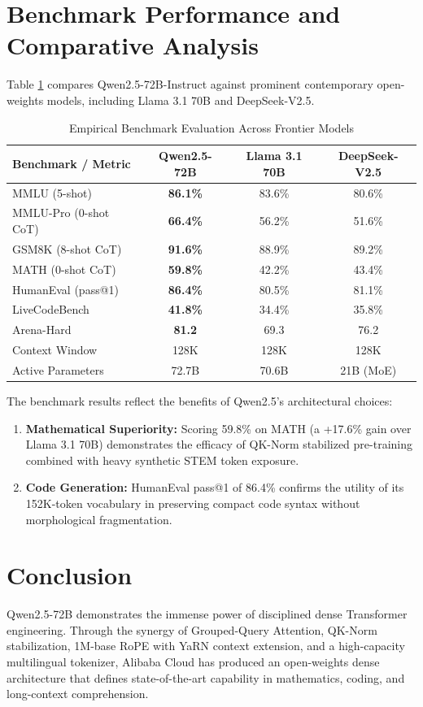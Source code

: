 \documentclass[conference]{IEEEtran}
\begin{document}
\section{Benchmark Performance and Comparative Analysis}
Table \ref{tab:benchmarks} compares Qwen2.5-72B-Instruct against prominent contemporary open-weights models, including Llama 3.1 70B \cite{dubey2024llama3} and DeepSeek-V2.5.

\begin{table}[htbp]
\caption{Empirical Benchmark Evaluation Across Frontier Models}
\label{tab:benchmarks}
\centering
\begin{tabular}{lccc}
\toprule
\textbf{Benchmark / Metric} & \textbf{Qwen2.5-72B} & \textbf{Llama 3.1 70B} & \textbf{DeepSeek-V2.5} \\
\midrule
MMLU (5-shot) & \textbf{86.1\%} & 83.6\% & 80.6\% \\
MMLU-Pro (0-shot CoT) & \textbf{66.4\%} & 56.2\% & 51.6\% \\
GSM8K (8-shot CoT) & \textbf{91.6\%} & 88.9\% & 89.2\% \\
MATH (0-shot CoT) & \textbf{59.8\%} & 42.2\% & 43.4\% \\
HumanEval (pass@1) & \textbf{86.4\%} & 80.5\% & 81.1\% \\
LiveCodeBench & \textbf{41.8\%} & 34.4\% & 35.8\% \\
Arena-Hard & \textbf{81.2} & 69.3 & 76.2 \\
Context Window & 128K & 128K & 128K \\
Active Parameters & 72.7B & 70.6B & 21B (MoE) \\
\bottomrule
\end{tabular}
\end{table}

The benchmark results reflect the benefits of Qwen2.5's architectural choices:
\begin{enumerate}
    \item \textbf{Mathematical Superiority:} Scoring 59.8\% on MATH (a +17.6\% gain over Llama 3.1 70B) demonstrates the efficacy of QK-Norm stabilized pre-training combined with heavy synthetic STEM token exposure.
    \item \textbf{Code Generation:} HumanEval pass@1 of 86.4\% confirms the utility of its 152K-token vocabulary in preserving compact code syntax without morphological fragmentation.
\end{enumerate}

\section{Conclusion}
Qwen2.5-72B demonstrates the immense power of disciplined dense Transformer engineering. Through the synergy of Grouped-Query Attention, QK-Norm stabilization, 1M-base RoPE with YaRN context extension, and a high-capacity multilingual tokenizer, Alibaba Cloud has produced an open-weights dense architecture that defines state-of-the-art capability in mathematics, coding, and long-context comprehension.
\end{document}
